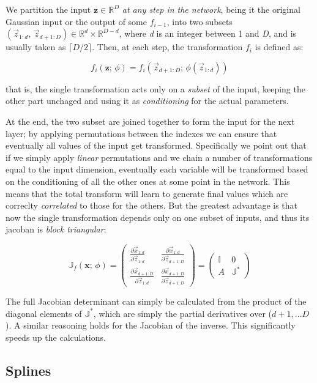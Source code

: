 We partition the input $\mathbf{z} \in \mathbb{R}^D$ \emph{at any step in the network}, being it the original Gaussian input or the output of some $f_{i-1}$, into two subsets $(\vec z_{1:d}, \, \vec z_{d+1:D}) \in \mathbb{R}^d \times \mathbb{R}^{D-d}$, where \emph{d} is an integer between 1 and \emph{D}, and is usually taken as $\lceil D/2 \rceil$. Then, at each step, the transformation $f_i$ is defined as:

\[
f_i(\mathbf{z}; \, \phi) = f_i(\vec z_{d+1:D}; \, \phi(\vec z_{1:d}))
\]

that is, the single transformation acts only on a \emph{subset} of the input, keeping the other part unchaged and using it as \emph{conditioning} for the actual parameters. 

At the end, the two subset are joined together to form the input for the next layer; by applying permutations between the indexes we can ensure that eventually all values of the input get transformed. Specifically we point out that if we simply apply \emph{linear} permutations and we chain a number of transformations equal to the input dimension, eventually each variable will be transformed based on the conditioning of all the other ones at some point in the network. This means that the total transform will learn to generate final values which are correclty \emph{correlated} to those for the others.
But the greatest advantage is that now the single transformation depends only on one subset of inputs, and thus its jacoban is \emph{block triangular}:

\[
\mathbb{J}_{f}(\mathbf{x}; \, \phi) = 
\begin{pmatrix}
\frac{\partial \vec x_{1:d}}{\partial \vec z_{1:d}} & \frac{\partial \vec x_{1:d}}{\partial \vec z_{d+1:D}}\\
\frac{\partial \vec x_{d+1:D}}{\partial \vec z_{1:d}} & \frac{\partial \vec x_{d+1:D}}{\partial \vec z_{d+1:D}}
\end{pmatrix}
=
\begin{pmatrix}
\mathbb{I} & 0\\
A & \mathbb{J}^*
\end{pmatrix}
\]

The full Jacobian determinant can simply be calculated from the product of the diagonal elements of $\mathbb{J}^*$, which are simply the partial derivatives over ($d+1, \dots D$). A similar reasoning holds for the Jacobian of the inverse.
This significantly speeds up the calculations.

\subsection{Splines}

